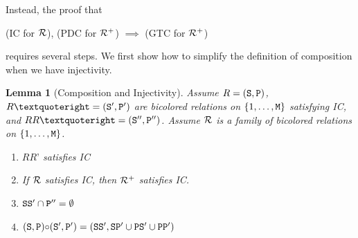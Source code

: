 \documentclass{lmcs}
\newtheorem{lemma}[theorem]{Lemma}
\begin{document}
Instead, the proof that 
\begin{center}
(IC for ${\mathcal R}$),  (PDC for ${\mathcal R}^+$)  $\implies$  (GTC for ${\mathcal R}^+$) 
\end{center}
requires several steps. 
We first show how to simplify the definition of composition when we have injectivity.


\begin{lemma}[Composition and Injectivity]
\label{lemma-composition-injectivity}
Assume $R=({\tt S},{\tt P})$, $R’=(\Stat',\Prog')$ are bicolored relations on $\{1, \ldots, {\tt M}\}$
satisfying IC, and $RR’ = (\Stat'',\Prog'')$. 
Assume ${\mathcal R}$ is a family of bicolored relations on $\{1, \ldots, {\tt M}\}$. 
\begin{enumerate}
\item
\label{lemma-composition-injectivity-01}
$RR’$ satisfies IC 

\item
\label{lemma-composition-injectivity-02}
If ${\mathcal R}$ satisfies IC, 
then ${\mathcal R}^+$ satisfies IC.

\item
\label{lemma-composition-injectivity-03}
${\tt S}{\tt S}' \cap {\tt P}'' = \emptyset$

\item
\label{lemma-composition-injectivity-04}
$
({\tt S},{\tt P}) {\circ} ({\tt S}',{\tt P}') 
= 
({\tt S}{\tt S}', {\tt S}{\tt P}' \cup {\tt P}{\tt S}'\cup {\tt P}{\tt P}')
$
\end{enumerate}
\end{lemma}
\end{document}
